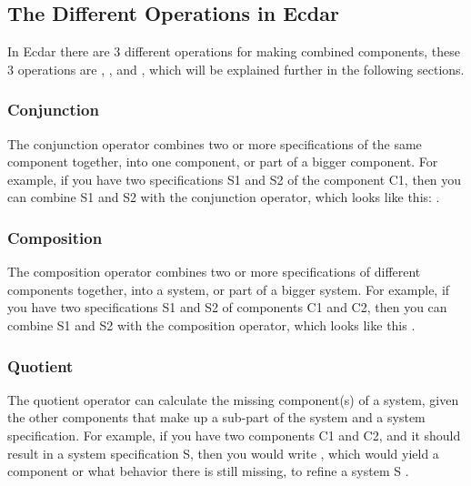 \subsection{The Different Operations in Ecdar} \label{RevaeelOperations}
In Ecdar there are 3 different operations for making combined components, these 3 operations are , , and , which will be explained further in the following sections.

\subsubsection*{Conjunction} \label{The-Different-Operations-In-Ecdar:Conjunction}
The conjunction operator combines two or more specifications of the same component together, into one component, or part of a bigger component. 
For example, if you have two specifications S1 and S2 of the component C1, then you can combine S1 and S2 with the conjunction operator, which looks like this:  \cite{goorden_specification_2022}.
 
\subsubsection*{Composition} \label{The-Different-Operations-In-Ecdar:Composition}
The composition operator combines two or more specifications of different components together, into a system, or part of a bigger system. 
For example, if you have two specifications S1 and S2 of components C1 and C2, then you can combine S1 and S2 with the composition operator, which looks like this  \cite{goorden_specification_2022}.

\subsubsection*{Quotient} \label{The-Different-Operations-In-Ecdar:Quotient}
The quotient operator can calculate the missing component(s) of a system, given the other components that make up a sub-part of the system and a system specification. For example, if you have two components C1 and C2, and it should result in a system specification S, then you would write , which would yield a component or what behavior there is still missing, to refine a system S \cite{goorden_specification_2022}.